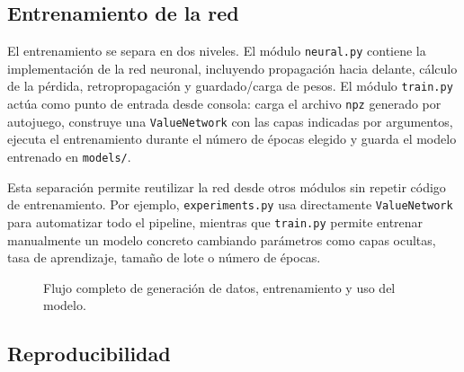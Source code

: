 \documentclass[conference,a4paper]{IEEEtran}
\begin{document}
\subsection{Entrenamiento de la red}

El entrenamiento se separa en dos niveles. El módulo \texttt{neural.py} contiene
la implementación de la red neuronal, incluyendo propagación hacia delante,
cálculo de la pérdida, retropropagación y guardado/carga de pesos. El módulo
\texttt{train.py} actúa como punto de entrada desde consola: carga el archivo
\texttt{npz} generado por autojuego, construye una \texttt{ValueNetwork} con las
capas indicadas por argumentos, ejecuta el entrenamiento durante el número de
épocas elegido y guarda el modelo entrenado en \texttt{models/}.

Esta separación permite reutilizar la red desde otros módulos sin repetir código
de entrenamiento. Por ejemplo, \texttt{experiments.py} usa directamente
\texttt{ValueNetwork} para automatizar todo el pipeline, mientras que
\texttt{train.py} permite entrenar manualmente un modelo concreto cambiando
parámetros como capas ocultas, tasa de aprendizaje, tamaño de lote o número de
épocas.

\begin{figure}[t]
\centering
{}
\caption{Flujo completo de generación de datos, entrenamiento y uso del modelo.}
\label{fig:flujo-experimental}
\end{figure}

\subsection{Reproducibilidad}
\end{document}
